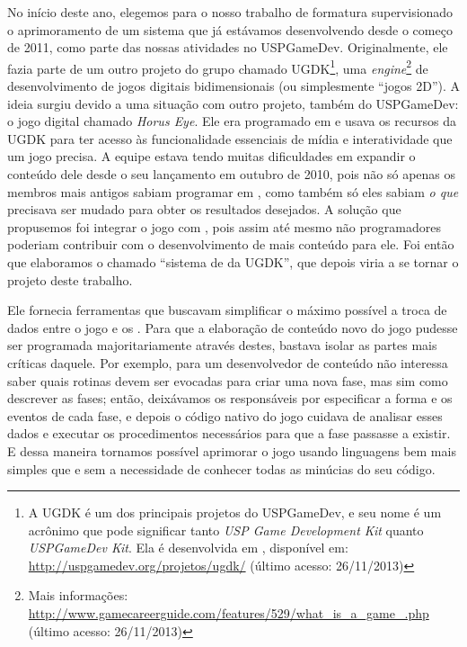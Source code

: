     No início deste ano, elegemos para o nosso trabalho de formatura supervisionado
    o aprimoramento de um sistema que já estávamos desenvolvendo desde o começo de
    2011, como parte das nossas atividades no USPGameDev. Originalmente, ele fazia
    parte de um outro projeto do grupo chamado UGDK\footnote{
      A UGDK é um dos principais projetos do USPGameDev, e seu
      nome é um acrônimo que pode significar tanto \emph{USP Game Development
      Kit} quanto \emph{USPGameDev Kit}. Ela é desenvolvida em \CXX{}, disponível em:
      \url{http://uspgamedev.org/projetos/ugdk/} (último acesso: 26/11/2013)
    }, uma \emph{engine}\footnote{
      Mais informações:
      \url{http://www.gamecareerguide.com/features/529/what\_is\_a\_game\_.php}
      (último acesso: 26/11/2013)
    } de desenvolvimento de jogos digitais bidimensionais (ou
    simplesmente ``jogos 2D''). A ideia surgiu devido a uma situação com
    outro projeto, também do USPGameDev: o jogo digital chamado
    \emph{Horus Eye}\footnotemark. Ele era programado em \CXX{} e usava os
    recursos da UGDK para ter acesso às funcionalidade essenciais de mídia e
    interatividade que um jogo precisa. A equipe estava tendo muitas dificuldades
    em expandir o conteúdo dele desde o seu lançamento em outubro de 2010, pois
    não só apenas os membros mais antigos sabiam programar em \CXX{}, como também
    só eles sabiam \emph{o que} precisava ser mudado para obter os resultados
    desejados. A solução que propusemos foi integrar o jogo com , pois
    assim até mesmo não programadores poderiam contribuir com o desenvolvimento
    de mais conteúdo para ele. Foi então que elaboramos o chamado ``sistema de
     da UGDK'', que depois viria a se tornar o projeto deste trabalho.


    Ele fornecia ferramentas que buscavam simplificar o máximo possível a
    troca de dados entre o jogo e os . Para que a elaboração de conteúdo
    novo do jogo pudesse ser programada majoritariamente através destes, bastava
    isolar as partes mais críticas daquele. Por exemplo, para um desenvolvedor de
    conteúdo não interessa saber quais rotinas devem ser evocadas para criar uma
    nova fase, mas sim como descrever as fases; então, deixávamos os 
    responsáveis por especificar a forma e os eventos de cada fase, e depois o
    código nativo do jogo cuidava de analisar esses dados e executar os
    procedimentos necessários para que a fase passasse a existir. E dessa maneira
    tornamos possível aprimorar o jogo usando linguagens bem mais simples que \CXX{}
    e sem a necessidade de conhecer todas as minúcias do seu código.

